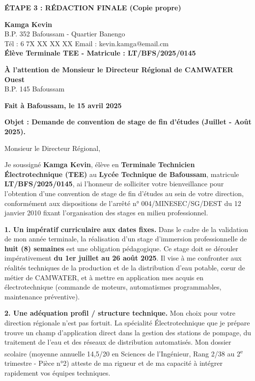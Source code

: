\documentclass[11pt]{article}
\begin{document}
\begin{exoresolu}
\textbf{ÉTAPE 3 : RÉDACTION FINALE (Copie propre)}

\begin{flushleft}
\textbf{Kamga Kevin} \\
B.P. 352 Bafoussam - Quartier Banengo \\
Tél : 6 7X XX XX XX \hfill Email : kevin.kamga@email.cm \\
\textbf{Élève Terminale TEE - Matricule : LT/BFS/2025/0145} \\
\vspace{0.5cm}

\textbf{À l'attention de Monsieur le Directeur Régional de CAMWATER Ouest} \\
B.P. 145 Bafoussam \\
\vspace{0.5cm}

\textbf{Fait à Bafoussam, le 15 avril 2025}

\textbf{Objet : Demande de convention de stage de fin d'études (Juillet - Août 2025).}
\end{flushleft}

Monsieur le Directeur Régional,

Je soussigné \textbf{Kamga Kevin}, élève en \textbf{Terminale Technicien Électrotechnique (TEE)} au \textbf{Lycée Technique de Bafoussam}, matricule \textbf{LT/BFS/2025/0145}, ai l'honneur de solliciter votre bienveillance pour l'obtention d'une convention de stage de fin d'études au sein de votre direction, conformément aux dispositions de l'arrêté n° 004/MINESEC/SG/DEST du 12 janvier 2010 fixant l'organisation des stages en milieu professionnel.

\textbf{1. Un impératif curriculaire aux dates fixes.}
Dans le cadre de la validation de mon année terminale, la réalisation d'un stage d'immersion professionnelle de \textbf{huit (8) semaines} est une obligation pédagogique. Ce stage doit se dérouler impérativement \textbf{du 1er juillet au 26 août 2025}. Il vise à me confronter aux réalités techniques de la production et de la distribution d'eau potable, cœur de métier de CAMWATER, et à mettre en application mes acquis en électrotechnique (commande de moteurs, automatismes programmables, maintenance préventive).

\textbf{2. Une adéquation profil / structure technique.}
Mon choix pour votre direction régionale n'est pas fortuit. La spécialité Électrotechnique que je prépare trouve un champ d'application direct dans la gestion des stations de pompage, du traitement de l'eau et des réseaux de distribution automatisés. Mon dossier scolaire (moyenne annuelle 14,5/20 en Sciences de l'Ingénieur, Rang 2/38 au 2\textsuperscript{e} trimestre - Pièce n°2) atteste de ma rigueur et de ma capacité à intégrer rapidement vos équipes techniques.


\end{exoresolu}
\end{document}
